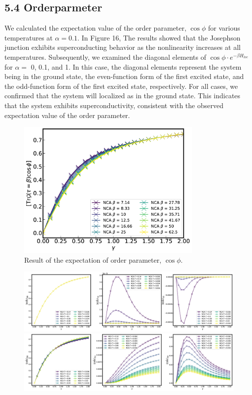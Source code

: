 \documentclass{article}[12pt]
\begin{document}
\begin{spacing}{1.5}
\subsection*{5.4 Orderparmeter}
We calculated the expectation value of the order parameter, $\cos\phi$ for various temperatures at $\alpha = 0.1$. 
In Figure 16, The results showed that the Josephson junction exhibits superconducting behavior as the nonlinearity increases at all temperatures. 
Subsequently, we examined the diagonal elements of $\cos\phi \cdot e^{−βH_{loc}}$ for $\alpha=$ 0, 0.1, and 1. 
In this case, the diagonal elements represent the system being in the ground state, the even-function form of the first excited state, 
and the odd-function form of the first excited state, respectively. 
For all cases, we confirmed that the system will localized as in the ground state. 
This indicates that the system exhibits superconductivity, consistent with the observed expectation value of the order parameter.\\
\begin{figure}[htbp]
  \centerline{\includegraphics[width=9cm]{TexFigure/Expec_alp_0.1 (1).png}}
  \caption{Result of the expectation of order parameter, $\cos\phi$.}
\end{figure}
\begin{figure}[htbp]
  \centerline{\includegraphics[width=14cm]{TexFigure/Matele_Ns3_alp0.png}}
  \centerline{\includegraphics[width=14cm]{TexFigure/Matele_Ns3_alp0_1.png}}

\end{figure}
\end{spacing}
\end{document}
